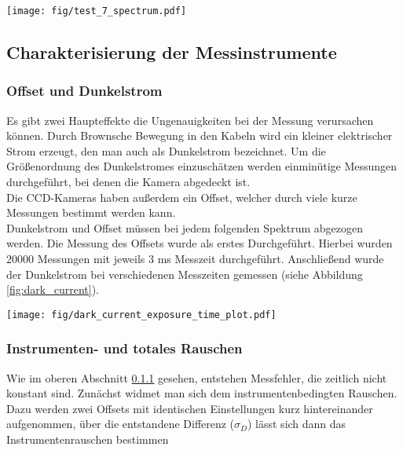 \documentclass[12pt, a4paper, bibliography=totoc]{scrartcl}
\begin{document}
\begin{multicols}{2}
\begin{center}
	\texttt{[image: fig/test\_7\_spectrum.pdf]}
	\label{fig:test_spectrum}

\end{center}

\subsection{Charakterisierung der Messinstrumente}\label{ssec:characteristic_of_the_instruments}

\subsubsection{Offset und Dunkelstrom}\label{sssec:O&D}

Es gibt zwei Haupteffekte die Ungenauigkeiten bei der Messung verursachen können.
Durch Brownsche Bewegung in den Kabeln wird ein kleiner elektrischer Strom erzeugt, den man auch als Dunkelstrom bezeichnet.
Um die Größenordnung des Dunkelstromes einzuschätzen werden einminütige Messungen durchgeführt, bei denen die Kamera abgedeckt ist.\\
Die CCD-Kameras haben außerdem ein Offset, welcher durch viele kurze Messungen bestimmt werden kann.\\
Dunkelstrom und Offset müssen bei jedem folgenden Spektrum abgezogen werden.
Die Messung des Offsets wurde als erstes Durchgeführt. 
Hierbei wurden $20000$ Messungen mit jeweils $3$ \si{ms} Messzeit durchgeführt.
Anschließend wurde der Dunkelstrom bei verschiedenen Messzeiten gemessen (siehe Abbildung \ref{fig:dark_current}).
    
\begin{center}
	\texttt{[image: fig/dark\_current\_exposure\_time\_plot.pdf]}
	\label{fig:dark_current}
\end{center}

\subsubsection{Instrumenten- und totales Rauschen}\label{sssec:instrumental_total_noise}

Wie im oberen Abschnitt \ref{sssec:O&D} gesehen, entstehen Messfehler, die zeitlich nicht konstant sind. Zunächst widmet man sich dem instrumentenbedingten Rauschen.
Dazu werden zwei Offsets mit identischen Einstellungen kurz hintereinander aufgenommen, über die entstandene Differenz ($\sigma_D$) lässt sich dann das Instrumentenrauschen bestimmen 


\end{multicols}
\end{document}
